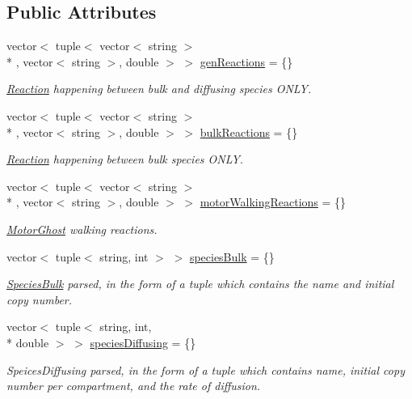 \subsection*{Public Attributes}
\begin{DoxyCompactItemize}
\item 
vector$<$ tuple$<$ vector$<$ string $>$\\*
, vector$<$ string $>$, double $>$ $>$ \hyperlink{structChemistryData_a4faa68797fd22c5247b9b52a9057023a}{gen\+Reactions} = \{\}
\begin{DoxyCompactList}\small\item\em \hyperlink{classReaction}{Reaction} happening between bulk and diffusing species O\+N\+L\+Y. \end{DoxyCompactList}\item 
vector$<$ tuple$<$ vector$<$ string $>$\\*
, vector$<$ string $>$, double $>$ $>$ \hyperlink{structChemistryData_a18d2b4d3d417507768bb50f7f43f427b}{bulk\+Reactions} = \{\}
\begin{DoxyCompactList}\small\item\em \hyperlink{classReaction}{Reaction} happening between bulk species O\+N\+L\+Y. \end{DoxyCompactList}\item 
vector$<$ tuple$<$ vector$<$ string $>$\\*
, vector$<$ string $>$, double $>$ $>$ \hyperlink{structChemistryData_a96d5d5289ae3651ab139b1de586b80e7}{motor\+Walking\+Reactions} = \{\}
\begin{DoxyCompactList}\small\item\em \hyperlink{classMotorGhost}{Motor\+Ghost} walking reactions. \end{DoxyCompactList}\item 
vector$<$ tuple$<$ string, int $>$ $>$ \hyperlink{structChemistryData_ae9c303af6cd6b503fe45515c4ee5132b}{species\+Bulk} = \{\}
\begin{DoxyCompactList}\small\item\em \hyperlink{classSpeciesBulk}{Species\+Bulk} parsed, in the form of a tuple which contains the name and initial copy number. \end{DoxyCompactList}\item 
vector$<$ tuple$<$ string, int, \\*
double $>$ $>$ \hyperlink{structChemistryData_acf21fd3143fa3bc4e0e1097ce15cb77c}{species\+Diffusing} = \{\}
\begin{DoxyCompactList}\small\item\em Speices\+Diffusing parsed, in the form of a tuple which contains name, initial copy number per compartment, and the rate of diffusion. \end{DoxyCompactList}\end{DoxyCompactItemize}
